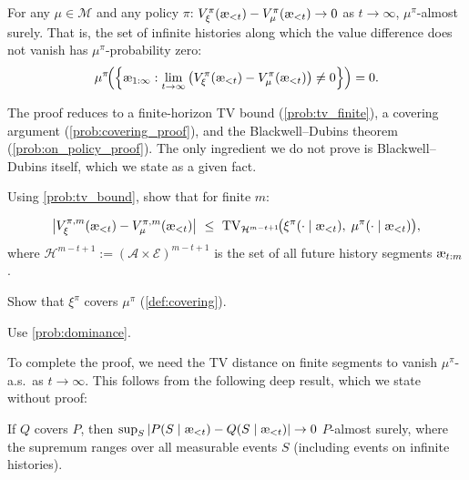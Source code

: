 \documentclass[fontsize=11pt, parskip=half]{scrartcl}
\newcommand{\cA}{\mathcal{A}}
\newcommand{\cE}{\mathcal{E}}
\newcommand{\cH}{\mathcal{H}}
\newcommand{\cM}{\mathcal{M}}
\newcommand{\TV}[1][]{\mathrm{TV}_{#1}}
\newcommand{\aes}{\textnormal{\ae}}
\begin{document}
\begin{theorem}\label{thm:on_policy}
For any $\mu \in \cM$ and any policy $\pi$:
$V_\xi^\pi(\aes_{<t}) - V_\mu^\pi(\aes_{<t}) \to 0$ as $t \to \infty$, $\mu^\pi$-almost surely.
That is, the set of infinite histories along which the value difference does not vanish has $\mu^\pi$-probability zero:
\[
    \mu^\pi\!\Big(\Big\{\aes_{1:\infty} : \lim_{t \to \infty} \big(V_\xi^\pi(\aes_{<t}) - V_\mu^\pi(\aes_{<t})\big) \neq 0\Big\}\Big) = 0.
\]
\end{theorem}

The proof reduces to a finite-horizon TV bound (\cref{prob:tv_finite}), a covering argument (\cref{prob:covering_proof}), and the Blackwell--Dubins theorem (\cref{prob:on_policy_proof}).
The only ingredient we do not prove is Blackwell--Dubins itself, which we state as a given fact.

\begin{exercise}
\label{prob:tv_finite}
Using \cref{prob:tv_bound}, show that for finite $m$:

\[
    \big|V_\xi^{\pi,m}(\aes_{<t}) - V_\mu^{\pi,m}(\aes_{<t})\big|
    ~\leq~ \TV[\cH^{m-t+1}]\!\big(\xi^\pi(\cdot \mid \aes_{<t}),\; \mu^\pi(\cdot \mid \aes_{<t})\big),
\]
where $\cH^{m-t+1} := (\cA \times \cE)^{m-t+1}$ is the set of all future history segments $\aes_{t:m}$.
\end{exercise}


\begin{exercise}[Covering]
\label{prob:covering_proof}
Show that $\xi^\pi$ covers $\mu^\pi$ (\cref{def:covering}).


\begin{hint}
Use \cref{prob:dominance}.
\end{hint}
\end{exercise}


To complete the proof, we need the TV distance on finite segments to vanish $\mu^\pi$-a.s.\ as $t \to \infty$.
This follows from the following deep result, which we state without proof:

\begin{fact}\label{fact:BD}
If $Q$ covers $P$, then
$\sup_S |P(S \mid \aes_{<t}) - Q(S \mid \aes_{<t})| \to 0$ $P$-almost surely,
where the supremum ranges over all measurable events $S$ (including events on infinite histories).
\end{fact}
\end{document}
